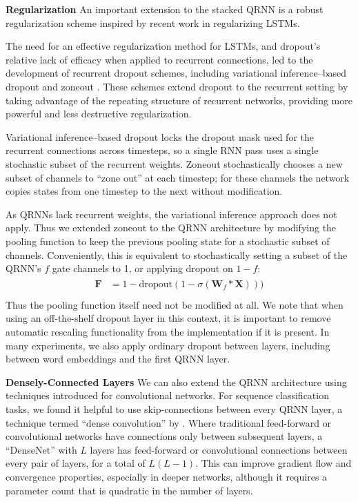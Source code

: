 \documentclass{article} \usepackage{iclr2017_conference,times}
\begin{document}
\textbf{Regularization} \label{sec:qrnn_reg}
An important extension to the stacked QRNN is a robust regularization scheme inspired by recent work in regularizing LSTMs.

The need for an effective regularization method for LSTMs, and dropout's relative lack of efficacy when applied to recurrent connections, led to the development of recurrent dropout schemes, including variational inference--based dropout \citep{Gal2015} and zoneout \citep{Krueger2016}. These schemes extend dropout to the recurrent setting by taking advantage of the repeating structure of recurrent networks, providing more powerful and less destructive regularization.

Variational inference--based dropout locks the dropout mask used for the recurrent connections across timesteps, so a single RNN pass uses a single stochastic subset of the recurrent weights.
Zoneout stochastically chooses a new subset of channels to ``zone out'' at each timestep; for these channels the network copies states from one timestep to the next without modification.

As QRNNs lack recurrent weights, the variational inference approach does not apply.  Thus we extended zoneout to the QRNN architecture by modifying the pooling function to keep the previous pooling state for a stochastic subset of channels. Conveniently, this is equivalent to stochastically setting a subset of the QRNN's $f$ gate channels to 1, or applying dropout on $1-f$:
\begin{align}
\begin{split}\label{qrnn_dropout}
\mathbf{F}&=1-\text{dropout}(1-\sigma(\mathbf{W}_f*\mathbf{X})))\\
\end{split}
\end{align}
Thus the pooling function itself need not be modified at all. We note that when using an off-the-shelf dropout layer in this context, it is important to remove automatic rescaling functionality from the implementation if it is present.
In many experiments, we also apply ordinary dropout between layers, including between word embeddings and the first QRNN layer.

\textbf{Densely-Connected Layers}
We can also extend the QRNN architecture using techniques introduced for convolutional networks. For sequence classification tasks, we found it helpful to use skip-connections between every QRNN layer, a technique termed ``dense convolution'' by \cite{Huang2016}. Where traditional feed-forward or convolutional networks have connections only between subsequent layers, a ``DenseNet'' with $L$ layers has feed-forward or convolutional connections between every pair of layers, for a total of $L(L-1)$. This can improve gradient flow and convergence properties, especially in deeper networks, although it requires a parameter count that is quadratic in the number of layers.
\end{document}
